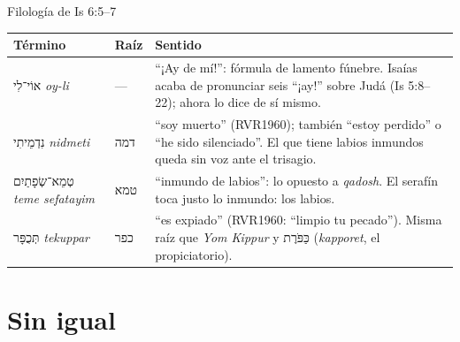 \documentclass[hyperref={bookmarks=false},aspectratio=169]{beamer}
\newcommand{\heb}[1]{\mbox{\foreignlanguage{hebrew}{#1}}}
\begin{document}
\begin{frame}{Filología de Is 6:5--7}
\renewcommand{\arraystretch}{1.25}\scriptsize
\begin{tabular}{@{}>{\RaggedRight\arraybackslash}p{3.0cm}>{\RaggedRight\arraybackslash}p{1.3cm}>{\RaggedRight\arraybackslash}p{7.4cm}@{}}
\toprule
\textbf{Término} & \textbf{Raíz} & \textbf{Sentido} \\ \midrule
\heb{אוֹי־לִי} \emph{oy-li} & --- & ``¡Ay de mí!'': fórmula de lamento fúnebre. Isaías acaba de pronunciar seis ``¡ay!'' sobre Judá (Is 5:8--22); ahora lo dice de sí mismo. \\
\heb{נִדְמֵיתִי} \emph{nidmeti} & \heb{דמה} & ``soy muerto'' (RVR1960); también ``estoy perdido'' o ``he sido silenciado''. El que tiene labios inmundos queda sin voz ante el trisagio. \\
\heb{טְמֵא־שְׂפָתַיִם} \emph{teme sefatayim} & \heb{טמא} & ``inmundo de labios'': lo opuesto a \emph{qadosh}. El serafín toca justo lo inmundo: los labios. \\
\heb{תְּכֻפָּר} \emph{tekuppar} & \heb{כפר} & ``es expiado'' (RVR1960: ``limpio tu pecado''). Misma raíz que \emph{Yom Kippur} y \heb{כַּפֹּרֶת} (\emph{kapporet}, el propiciatorio). \\
\bottomrule
\end{tabular}
\vspace{4pt}
\begin{center}
\end{center}
\end{frame}

\section{Sin igual}
\end{document}
